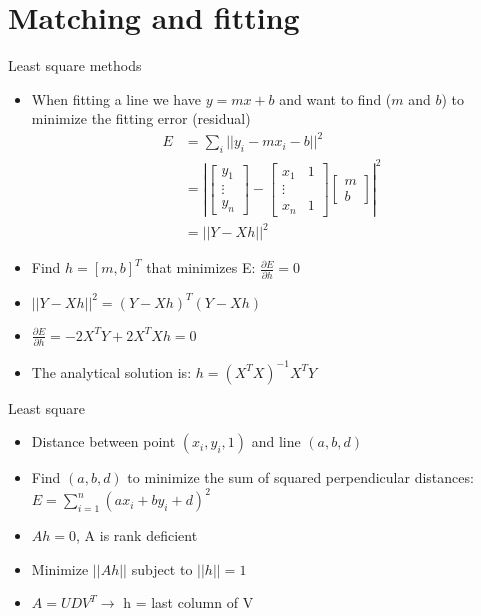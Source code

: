 \documentclass[10pt,mathserif]{beamer}
\begin{document}
\section{Matching and fitting}
\begin{frame}{Least square methods}
\begin{itemize}
\item When fitting a line we have $y = mx +b$ and want to find ($m$ and $b$) to minimize the fitting error (residual)  
\begin{align}
E &= \sum_{i}||y_i - mx_i -b||^2 \\
&= \left|\begin{bmatrix}y_1 \\ \vdots \\ y_n \end{bmatrix} - \begin{bmatrix} x_1 & 1 \\ \vdots \\
x_n & 1 \end{bmatrix} \begin{bmatrix} m \\ b \end{bmatrix} \right|^2 \\
& = || Y - Xh||^2
\end{align}
\item Find $h=[m,b]^T$ that minimizes E: $\frac{\partial E}{\partial h} = 0$
\item $||Y - Xh||^2 = (Y -Xh)^T(Y-Xh)$
\item  $\frac{\partial E}{\partial h} = -2 X^TY+ 2X^TXh =0$  
\item The analytical solution is: $h = (X^TX)^{-1}X^TY$
\end{itemize}
\end{frame}

\begin{frame}{Least square}
\begin{itemize}
\item Distance between point $(x_i, y_i, 1)$ and line $(a,b,d)$
\item Find $(a,b,d)$ to minimize the sum of squared perpendicular distances: 
$E = \sum_{i=1}^n (ax_i + by_i +d)^2$
\item $Ah=0$, A is rank deficient
\item Minimize $||Ah||$ subject to $||h|| =1$
\item $ A= UDV^T \rightarrow$ h = last column of V  
\end{itemize}
\end{frame}
\end{document}
